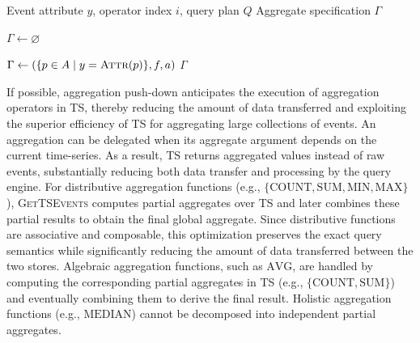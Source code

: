 \begin{algorithm}[t]
\footnotesize
\caption{\textsc{GetAggregate}}
\label{alg:get-aggregate}
\begin{algorithmic}[1]

\Require Event attribute $y$, operator index $i$, query plan $Q$
\Ensure Aggregate specification $\Gamma$

\label{proc:get-aggregate}
    \State $\Gamma \gets \varnothing$
    \label{line:ga:expand-check}
        \item[] 


        \label{line:ga:aggregate-check} 
            \State $\Gamma \gets
            \left(
                \{p \in A \mid y = \textsc{Attr}(p)\},
                f,
                a
            \right)$
            \label{line:ga:construct}
        \EndIf
        \EndFor
    \EndIf
    \State \Return $\Gamma$
    \label{line:ga:return-empty}
\EndProcedure
\end{algorithmic}
\end{algorithm}
If possible, aggregation push-down anticipates the execution of aggregation operators in TS, thereby reducing the amount of data transferred and exploiting the superior efficiency of TS for aggregating large collections of events.
An aggregation can be delegated when its aggregate argument depends on the current time-series.
As a result, TS returns aggregated values instead of raw events, substantially reducing both data transfer and processing by the query engine.
For distributive aggregation functions (e.g., $\{\mathrm{COUNT}, \mathrm{SUM}, \mathrm{MIN}, \mathrm{MAX}\}$), \textsc{GetTSEvents} computes partial aggregates over TS and  later combines these partial results to obtain the final global aggregate.
Since distributive functions are associative and composable, this optimization preserves the exact query semantics while significantly reducing the amount of data transferred between the two stores.
Algebraic aggregation functions, such as $\mathrm{AVG}$, are handled by computing the corresponding partial aggregates in TS (e.g.,  $\{\mathrm{COUNT}, \mathrm{SUM}\}$) and eventually combining them to derive the final result.
Holistic aggregation functions (e.g., $\mathrm{MEDIAN}$) cannot be decomposed into independent partial aggregates.

